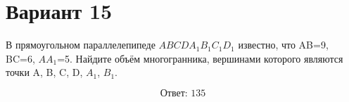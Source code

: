 \documentclass[12pt,a4paper]{article}
\begin{document}
\section*{Вариант 15}

В прямоугольном параллелепипеде \(ABCDA_1B_1C_1D_1\) известно, что AB=9, BC=6, \(AA_1\)=5. Найдите объём многогранника, вершинами которого являются точки A, B, C, D, \(A_1\), \(B_1\).

\begin{center}
\end{center}

\[
\boxed{\text{Ответ: }135}
\]
\end{document}
